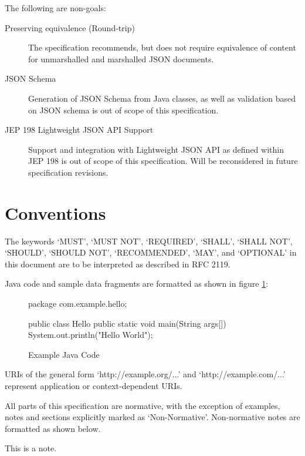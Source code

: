 The following are non-goals:

\begin{description}

\item[Preserving equivalence (Round-trip)] The specification recommends, but does not require equivalence of content for unmarshalled and marshalled JSON documents.

\item[JSON Schema] Generation of JSON Schema from Java classes, as well as validation based on JSON schema is out of scope of this specification.

\item[JEP 198 Lightweight JSON API Support] Support and integration with Lightweight JSON API as defined within JEP 198 is out of scope of this specification. Will be reconsidered in future specification revisions.

\end{description}

\section{Conventions}

The keywords `MUST', `MUST NOT', `REQUIRED', `SHALL', `SHALL NOT', `SHOULD', `SHOULD NOT', `RECOMMENDED', `MAY', and `OPTIONAL' in this document are to be interpreted as described in RFC 2119\cite{rfc2119}. 

Java code and sample data fragments are formatted as shown in figure \ref{ex1}:

\begin{figure}[hbtp]
\caption{Example Java Code}
\label{ex1}
\begin{listing}{1}
package com.example.hello;

public class Hello {
    public static void main(String args[]) {
        System.out.println("Hello World");
    }
}\end{listing}
\end{figure}

URIs of the general form `http://example.org/...' and `http://example.com/...' represent application or context-dependent URIs.

All parts of this specification are normative, with the exception of examples, notes and sections explicitly marked as `Non-Normative'. Non-normative notes are formatted as shown below.

\begin{nnnote*}
This is a note.
\end{nnnote*}

